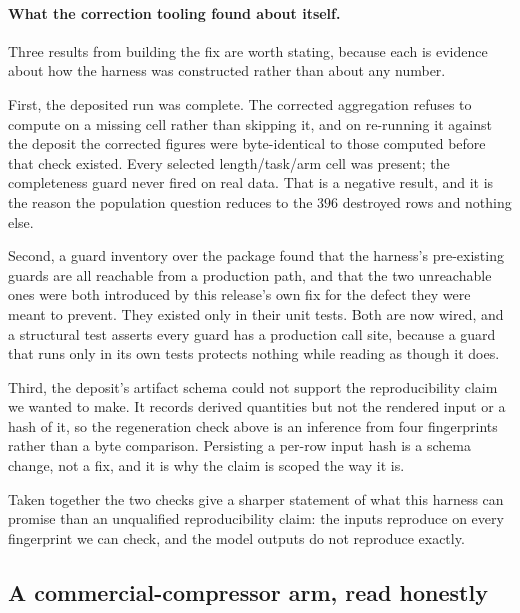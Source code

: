 \documentclass[11pt]{article}
\begin{document}
\paragraph{What the correction tooling found about itself.} Three results from building the fix
are worth stating, because each is evidence about how the harness was constructed rather than
about any number.

First, the deposited run was complete. The corrected aggregation refuses to compute on a missing
cell rather than skipping it, and on re-running it against the deposit the corrected figures were
byte-identical to those computed before that check existed. Every selected
length/task/arm cell was present; the completeness guard never fired on real data. That is a
negative result, and it is the reason the population question reduces to the $396$ destroyed rows
and nothing else.

Second, a guard inventory over the package found that the harness's pre-existing guards are all
reachable from a production path, and that the two unreachable ones were both introduced by this
release's own fix for the defect they were meant to prevent. They existed only in their unit
tests. Both are now wired, and a structural test asserts every guard has a production call site,
because a guard that runs only in its own tests protects nothing while reading as though it does.

Third, the deposit's artifact schema could not support the reproducibility claim we wanted to
make. It records derived quantities but not the rendered input or a hash of it, so the
regeneration check above is an inference from four fingerprints rather than a byte comparison.
Persisting a per-row input hash is a schema change, not a fix, and it is why the claim is scoped
the way it is.

Taken together the two checks give a sharper statement of what this harness can promise than an
unqualified reproducibility claim: the inputs reproduce on every fingerprint we can check, and the
model outputs do not reproduce exactly.

\subsection{A commercial-compressor arm, read honestly}
\label{sec:compresr}
\end{document}
